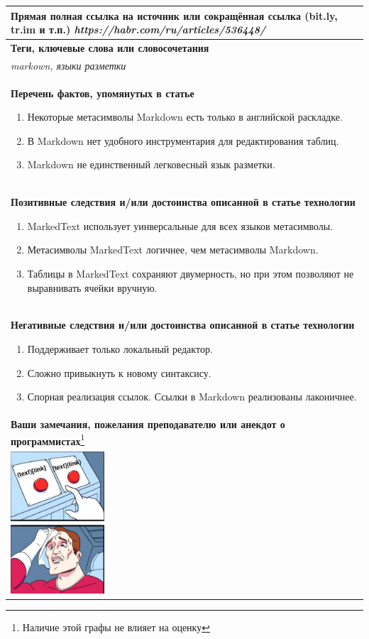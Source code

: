 \documentclass[12pt]{article}
\begin{document}
\begin{tabularx}{\textwidth} { 
  | >{\raggedright\arraybackslash}X|}
    \textbf{Прямая полная ссылка на источник или сокращённая ссылка (bit.ly, tr.im и т.п.)} 
    \textit{https://habr.com/ru/articles/536448/}
    \smallskip\\
    \hline
    \textbf{Теги, ключевые слова или словосочетания}\\
    \textit{markown, языки разметки}
    \smallskip\\
    \hline
    \textbf{Перечень фактов, упомянутых в статье}
    \begin{enumerate}
	\item Некоторые метасимволы Markdown есть только в английской раскладке. 
	\item В Markdown нет удобного инструментария для редактирования таблиц.
	\item Markdown не единственный легковесный язык разметки.
	\end{enumerate}
    \\ \hline
    \textbf{Позитивные следствия и/или достоинства описанной в статье технологии}
    \begin{enumerate}
    	\item MarkedText использует уинверсальные для всех языков метасимволы.
    	\item Метасимволы MarkedText логичнее, чем метасимволы Markdown.
	\item Таблицы в MarkedText сохраняют двумерность, но при этом позволяют не выравнивать ячейки вручную.
    \end{enumerate}
    \\ \hline
    \textbf{Негативные следствия и/или достоинства описанной в статье технологии}
    \begin{enumerate}
	\item Поддерживает только локальный редактор.
    	\item Сложно привыкнуть к новому синтаксису.
	\item Спорная реализация ссылок. Ссылки в Markdown реализованы лаконичнее.
    \end{enumerate}
    \\ \hline
    \textbf{Ваши замечания, пожелания преподавателю или анекдот о программистах}\footnote{Наличие этой графы не влияет на оценку}\\
    \includegraphics[width=3.5cm]{meme_4_ann.jpg}

    
\end{tabularx}
\end{document}
